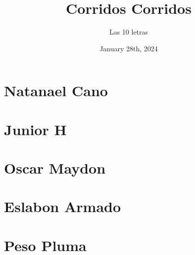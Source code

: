 \documentclass{article}
\title{Corridos Corridos}
\date{January 28th, 2024}
\author{Las 10 letras}
\begin{document}
\maketitle{}
\tableofcontents

\renewcommand\guitarPreAccord{\color{amaranth}\footnotesize\strut\bfseries}

%
\newpage
\section{Natanael Cano}

















\section{Junior H}













\section{Oscar Maydon}


\section{Eslabon Armado}





\section{Peso Pluma}	



\end{document}
